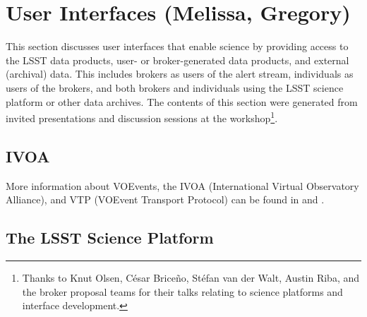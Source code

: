 \section{User Interfaces (Melissa, Gregory)} \label{sec:interfaces}



This section discusses user interfaces that enable science by providing access to the LSST data products, user- or broker-generated data products, and external (archival) data.
This includes brokers as users of the alert stream, individuals as users of the brokers, and both brokers and individuals using the LSST science platform or other data archives.
The contents of this section were generated from invited presentations and discussion sessions at the workshop\footnote{Thanks to Knut Olsen, César Briceño, Stéfan van der Walt, Austin Riba, and the broker proposal teams for their talks relating to science platforms and interface development.}.

\subsection{IVOA}\label{ssec:interfaces_ivoa}


More information about VOEvents, the IVOA (International Virtual Observatory Alliance), and VTP (VOEvent Transport Protocol) can be found in \citet{2011ivoa.spec.0711S} and \citet{2017arXiv170901264A}.


\subsection{The LSST Science Platform}\label{ssec:interfaces_lsp}

